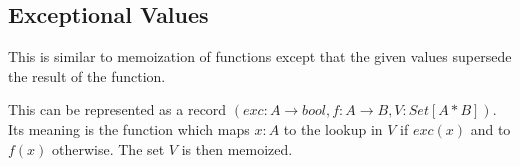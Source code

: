 \subsection{Exceptional Values}

This is similar to memoization of functions except that the given values supersede the result of the function.

This can be represented as a record $(exc: A \to bool, f: A \to B, V: Set[A*B])$.
Its meaning is the function which maps $x:A$ to the lookup in $V$ if $exc(x)$ and to $f(x)$ otherwise.
The set $V$ is then memoized.